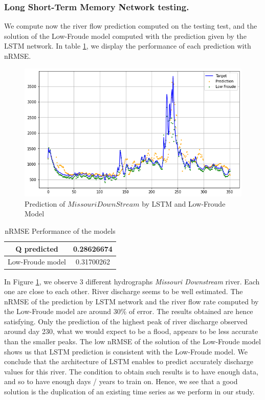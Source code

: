 \subsubsection{Long Short-Term Memory Network testing.}

We compute now the river flow prediction computed on the testing test, and the solution of the Low-Froude model computed with the prediction given by the LSTM network. In table \ref{tab:perf_lstm}, we display the performance of each prediction with nRMSE.

\begin{figure}[H]

\centering
\includegraphics[scale = 0.5]{Graph/pred_low_fr_missour_lstm.png}
\caption{Prediction of $MissouriDownStream$ by LSTM and Low-Froude Model}
\label{fig: lest result} 
\end{figure}

\begin{table}[H]
    \centering
    \begin{tabular}{|c|c|}
    \hline 
        
         Q predicted & 0.28626674 \\
         \hline 
         Low-Froude model & 0.31700262 \\
    \hline
    \end{tabular}
    \caption{nRMSE Performance of the models}
    \label{tab:perf_lstm}
\end{table}

In Figure \ref{fig: lest result}, we observe 3 different hydrographs \textit{Missouri Downstream} river. Each one are close to each other. River discharge seems to be well estimated. The nRMSE of the prediction by LSTM network and the river flow rate computed by the Low-Froude model are around 30\% of error. The results obtained are hence satisfying. Only the prediction of the highest peak of river discharge observed around day 230, what we would expect to be a flood, appears to be less accurate than the smaller peaks. The low nRMSE of the solution of the Low-Froude model shows us that LSTM prediction is consistent with the Low-Froude model. 
We conclude that the architecture of LSTM enables to predict accurately discharge values for this river. The condition to obtain such results is to have enough data, and so to have enough days / years to train on. Hence, we see that a good solution is the duplication of an existing time series as we perform in our study.

